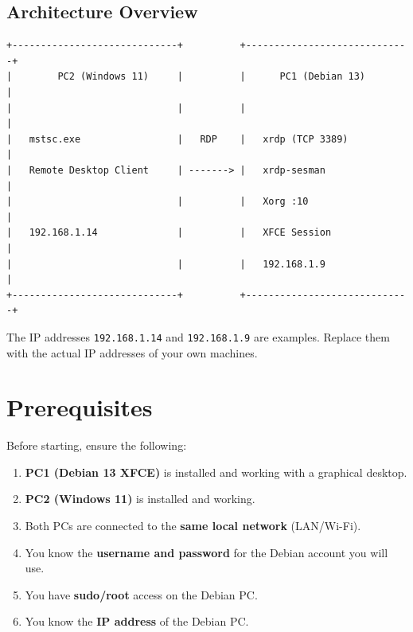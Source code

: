 \documentclass[a4paper,12pt]{article}
\newcommand{\code}[1]{\texttt{\small #1}}
\begin{document}
\subsection{Architecture Overview}

\begin{lstlisting}[style=textstyle]
+-----------------------------+          +-----------------------------+
|        PC2 (Windows 11)     |          |      PC1 (Debian 13)        |
|                             |          |                             |
|   mstsc.exe                 |   RDP    |   xrdp (TCP 3389)           |
|   Remote Desktop Client     | -------> |   xrdp-sesman               |
|                             |          |   Xorg :10                  |
|   192.168.1.14              |          |   XFCE Session              |
|                             |          |   192.168.1.9               |
+-----------------------------+          +-----------------------------+
\end{lstlisting}

\begin{notebox}
The IP addresses \code{192.168.1.14} and \code{192.168.1.9} are examples. Replace them with the actual IP addresses of your own machines.
\end{notebox}

\section{Prerequisites}

Before starting, ensure the following:

\begin{enumerate}[leftmargin=2em]
    \item \textbf{PC1 (Debian 13 XFCE)} is installed and working with a graphical desktop.
    \item \textbf{PC2 (Windows 11)} is installed and working.
    \item Both PCs are connected to the \textbf{same local network} (LAN/Wi-Fi).
    \item You know the \textbf{username and password} for the Debian account you will use.
    \item You have \textbf{sudo/root} access on the Debian PC.
    \item You know the \textbf{IP address} of the Debian PC.
\end{enumerate}
\end{document}

